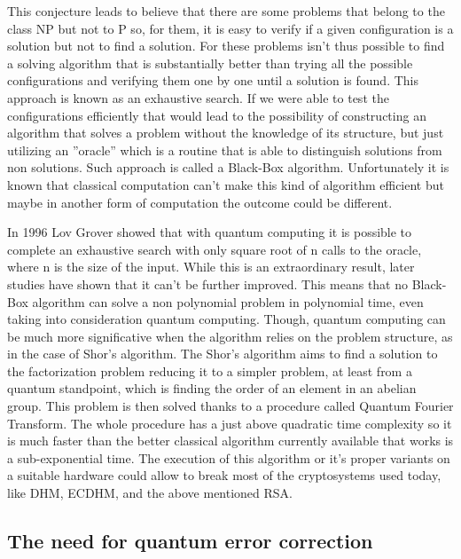 \documentclass{article}
\begin{document}
\vspace{10pt}

\noindent This conjecture leads to believe that there are some problems that belong to
the class NP but not to P so, for them, it is easy to verify if a given configuration is
a solution but not to find a solution. For these problems isn’t thus possible to find a
solving algorithm that is substantially better than trying all the possible configurations
and verifying them one by one until a solution is found. This approach is known as an
exhaustive search.
If we were able to test the configurations efficiently that would lead to the possibility
of constructing an algorithm that solves a problem without the knowledge
of its structure, but just utilizing an ”oracle” which is a routine that is able to
distinguish solutions from non solutions.
Such approach is called a Black-Box algorithm.
Unfortunately it is known that classical computation can’t make this kind of algorithm
efficient but maybe in another form of computation the outcome could be different.

\newpage

\noindent In 1996 Lov Grover showed that with quantum computing it is possible to
complete an exhaustive search with only square root of n calls to the oracle,
where n is the size of the input. While this is an extraordinary result, later
studies have shown that it can’t be further improved.
This means that no Black-Box algorithm can solve a non polynomial problem
in polynomial time, even taking into consideration quantum computing.
Though, quantum computing can be much more significative when the algorithm
relies on the problem structure, as in the case of Shor’s algorithm.
The Shor’s algorithm aims to find a solution to the factorization problem reducing
it to a simpler problem, at least from a quantum standpoint,
which is finding the order of an element in an abelian group. This problem is
then solved thanks to a procedure called Quantum Fourier Transform.
The whole procedure has a just above quadratic time complexity so it is
much faster than the better classical algorithm currently available that works
is a sub-exponential time.
The execution of this algorithm or it’s proper variants on a suitable hardware
could allow to break most of the cryptosystems used today, like DHM, ECDHM,
and the above mentioned RSA.

\vspace{20pt}


\subsection{The need for quantum error correction}
\end{document}
